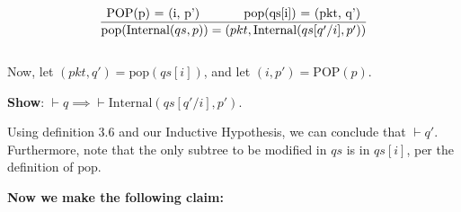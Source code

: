\documentclass{article}
\begin{document}
$$\frac{\text{POP(p) = (i, p') \hspace{1cm} \text{pop}(qs[i]) = (pkt, q')}}{{\text{pop}(\text{Internal}(qs, p)) = (pkt, \text{Internal}(qs[q'/i], p'))}}$$\\[-10pt]

Now, let $(pkt, q') = \text{pop}(qs[i])$, and let $(i, p') = \text{POP}(p)$.\newline

\textbf{Show}: $\vdash q \implies \vdash \text{Internal}(qs[q'/i], p')$.\newline

Using definition 3.6 and our Inductive Hypothesis, we can conclude that $\vdash q'$. Furthermore, note that the only subtree to be modified in $qs$ is in $qs[i]$, per the definition of $\text{pop}$.\newline

\textbf{Now we make the following claim:}\\[-20pt]
\end{document}
